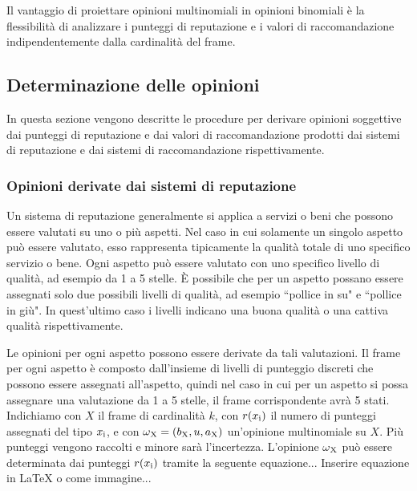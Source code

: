 \documentclass{report}
\begin{document}
	Il vantaggio di proiettare opinioni multinomiali in opinioni binomiali è
	la flessibilità di analizzare i punteggi di reputazione e i valori di
	raccomandazione indipendentemente dalla cardinalità del frame.
	
	\hypertarget{header-n96}{%
		\subsection{Determinazione delle opinioni}\label{header-n96}}
	
	In questa sezione vengono descritte le procedure per derivare opinioni
	soggettive dai punteggi di reputazione e dai valori di raccomandazione
	prodotti dai sistemi di reputazione e dai sistemi di raccomandazione
	rispettivamente.
	
	\hypertarget{header-n99}{%
		\subsubsection{Opinioni derivate dai sistemi di
			reputazione}\label{header-n99}}
	
	Un sistema di reputazione generalmente si applica a servizi o beni che
	possono essere valutati su uno o più aspetti. Nel caso in cui solamente
	un singolo aspetto può essere valutato, esso rappresenta tipicamente la
	qualità totale di uno specifico servizio o bene. Ogni aspetto può essere
	valutato con uno specifico livello di qualità, ad esempio da 1 a 5
	stelle. È possibile che per un aspetto possano essere assegnati solo due
	possibili livelli di qualità, ad esempio ``pollice in su" e ``pollice in
	giù". In quest'ultimo caso i livelli indicano una buona qualità o una
	cattiva qualità rispettivamente.
	
	Le opinioni per ogni aspetto possono essere derivate da tali
	valutazioni. Il frame per ogni aspetto è composto dall'insieme di
	livelli di punteggio discreti che possono essere assegnati all'aspetto,
	quindi nel caso in cui per un aspetto si possa assegnare una valutazione
	da 1 a 5 stelle, il frame corrispondente avrà 5 stati. Indichiamo con $X$
	il frame di cardinalità $k$, con $r(x\textsubscript{i})$ il numero di punteggi assegnati del
	tipo $x\textsubscript{i}$, e con $\omega\textsubscript{X} =(b\textsubscript{X},u,a\textsubscript{X})$ un'opinione multinomiale su $X$. Più punteggi
	vengono raccolti e minore sarà l'incertezza. L'opinione $\omega\textsubscript{X}$ può
	essere determinata dai punteggi $r(x\textsubscript{i})$ tramite la seguente equazione...
	Inserire equazione in \LaTeX{} o come immagine...
	
\end{document}
